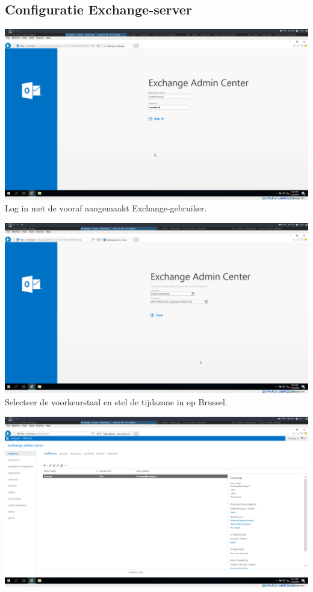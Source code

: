 \documentclass[a4paper]{article}
\begin{document}
\subsection{Configuratie Exchange-server}
\begin{center}
	\includegraphics[width=15cm]{Pictures/Exchange/config/1543422514.png}
	Log in met de vooraf aangemaakt Exchange-gebruiker.
\end{center}
\begin{center}
	\includegraphics[width=15cm]{Pictures/Exchange/config/1543424938.png}
	Selecteer de voorkeurstaal en stel de tijdszone in op Brussel.
\end{center}
\begin{center}
	\includegraphics[width=15cm]{Pictures/Exchange/config/1543425072.png}
\end{center}
\end{document}
